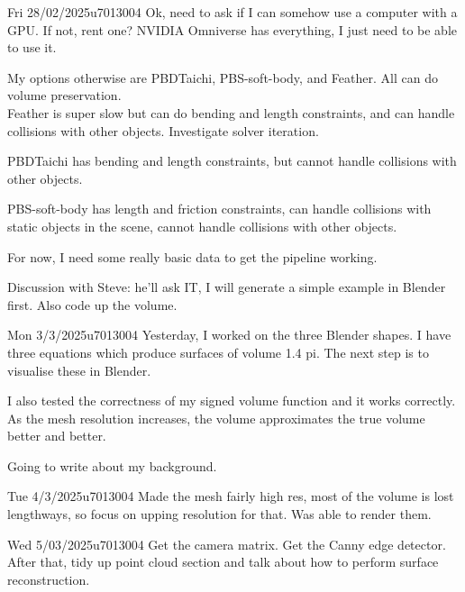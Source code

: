 \documentclass{project-logbook}
\begin{document}
	\begin{MeetingMinutes}{Fri 28/02/2025}{u7013004}
		Ok, need to ask if I can somehow use a computer with a GPU. If not, rent one?
		NVIDIA Omniverse has everything, I just need to be able to use it.
		
		My options otherwise are PBDTaichi, PBS-soft-body, and Feather.
		All can do volume preservation.\\

		Feather is super slow but can do bending and length constraints, and can handle collisions with other objects. Investigate solver iteration.

		PBDTaichi has bending and length constraints, but cannot handle collisions with other objects.

		PBS-soft-body has length and friction constraints, can handle collisions with static objects in the scene, cannot handle collisions with other objects.

		For now, I need some really basic data to get the pipeline working. 

		Discussion with Steve: he'll ask IT, I will generate a simple example in Blender first. Also code up the volume.

	\end{MeetingMinutes}

	\begin{MeetingMinutes}{Mon 3/3/2025}{u7013004}
		Yesterday, I worked on the three Blender shapes. I have three equations which produce surfaces of volume 1.4 pi. The next step is to visualise these in Blender.
		
		I also tested the correctness of my signed volume function and it works correctly. As the mesh resolution increases, the volume approximates the true volume better and better.

		Going to write about my background.
	\end{MeetingMinutes}

	\begin{MeetingMinutes}{Tue 4/3/2025}{u7013004}
		Made the mesh fairly high res, most of the volume is lost lengthways, so focus on upping resolution for that. Was able to render them.
	\end{MeetingMinutes}

	\begin{MeetingMinutes}{Wed 5/03/2025}{u7013004}
		Get the camera matrix.
		Get the Canny edge detector.
		After that, tidy up point cloud section and talk about how to perform surface reconstruction.
	\end{MeetingMinutes}
\end{document}

